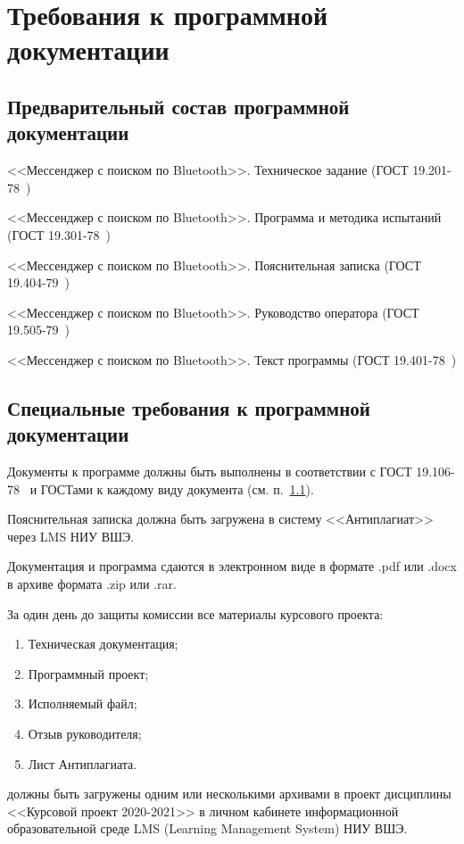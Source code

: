\documentclass[techtask]{espd}
\begin{document}
\section{Требования к программной документации}
\subsection{Предварительный состав программной документации}\label{subsection:documentation}
<<Мессенджер с поиском по Bluetooth>>. Техническое задание (ГОСТ 19.201-78~\cite{espd201})

<<Мессенджер с поиском по Bluetooth>>. Программа и методика испытаний (ГОСТ 19.301-78~\cite{espd301})

<<Мессенджер с поиском по Bluetooth>>. Пояснительная записка (ГОСТ 19.404-79~\cite{espd404})

<<Мессенджер с поиском по Bluetooth>>. Руководство оператора (ГОСТ 19.505-79~\cite{espd505})

<<Мессенджер с поиском по Bluetooth>>. Текст программы (ГОСТ 19.401-78~\cite{espd401})

\subsection{Специальные требования к программной документации}\label{subsection:docspec}
Документы к программе должны быть выполнены в соответствии с ГОСТ 19.106-78~\cite{espd106} и ГОСТами к каждому виду документа (см. п.~\ref{subsection:documentation}).

Пояснительная записка должна быть загружена в систему <<Антиплагиат>> через LMS НИУ ВШЭ.

Документация и программа сдаются в электронном виде в формате .pdf или .docx в архиве формата .zip или .rar.

За один день до защиты комиссии все материалы курсового проекта:
\begin{enumerate}
\item Техническая документация;
\item Программный проект;
\item Исполняемый файл;
\item Отзыв руководителя;
\item Лист Антиплагиата.
\end{enumerate}
должны быть загружены одним или несколькими архивами в проект дисциплины <<Курсовой проект 2020-2021>> в личном кабинете информационной образовательной среде LMS (Learning Management System) НИУ ВШЭ.
\end{document}
